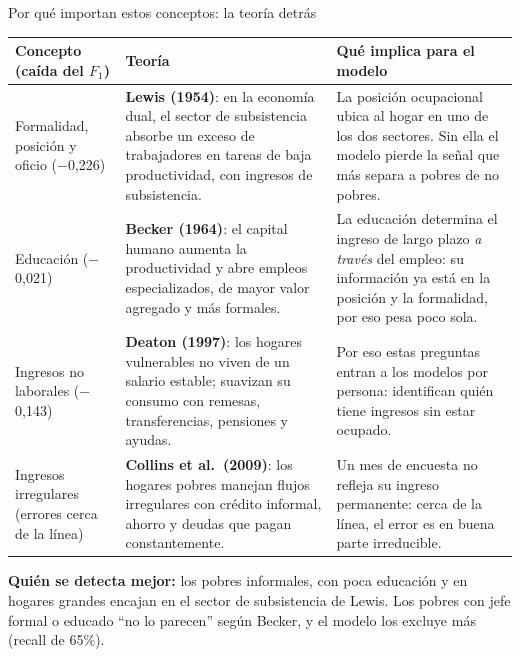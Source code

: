 \documentclass[aspectratio=169,10pt]{beamer}
\begin{document}
\begin{frame}{Por qué importan estos conceptos: la teoría detrás}
\scriptsize
\setlength{\tabcolsep}{5pt}
\renewcommand{\arraystretch}{1.25}
\begin{tabular}{@{}>{\raggedright\arraybackslash}p{2.9cm}>{\raggedright\arraybackslash}p{5.4cm}>{\raggedright\arraybackslash}p{5.3cm}@{}}
\toprule
\textbf{Concepto (caída del $F_1$)} & \textbf{Teoría} & \textbf{Qué implica para el modelo} \\
\midrule
Formalidad, posición y oficio ($-$0,226) &
  \textbf{Lewis (1954)}: en la economía dual, el sector de subsistencia
  absorbe un exceso de trabajadores en tareas de baja productividad, con
  ingresos de subsistencia. &
  La posición ocupacional ubica al hogar en uno de los dos sectores. Sin
  ella el modelo pierde la señal que más separa a pobres de no pobres. \\
Educación ($-$0,021) &
  \textbf{Becker (1964)}: el capital humano aumenta la productividad y abre
  empleos especializados, de mayor valor agregado y más formales. &
  La educación determina el ingreso de largo plazo \emph{a través} del
  empleo: su información ya está en la posición y la formalidad, por eso
  pesa poco sola. \\
Ingresos no laborales ($-$0,143) &
  \textbf{Deaton (1997)}: los hogares vulnerables no viven de un salario
  estable; suavizan su consumo con remesas, transferencias, pensiones y
  ayudas. &
  Por eso estas preguntas entran a los modelos por persona: identifican
  quién tiene ingresos sin estar ocupado. \\
Ingresos irregulares (errores cerca de la línea) &
  \textbf{Collins et al.\ (2009)}: los hogares pobres manejan flujos
  irregulares con crédito informal, ahorro y deudas que pagan
  constantemente. &
  Un mes de encuesta no refleja su ingreso permanente: cerca de la línea,
  el error es en buena parte irreducible. \\
\bottomrule
\end{tabular}
\vspace{1mm}

\footnotesize
\textbf{Quién se detecta mejor:} los pobres informales, con poca
educación y en hogares grandes encajan en el sector de subsistencia de
Lewis. Los pobres con jefe formal o educado ``no lo parecen'' según Becker,
y el modelo los excluye más (recall de 65\%).
\end{frame}
\end{document}

